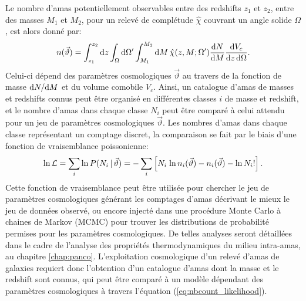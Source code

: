 Le nombre d'amas potentiellement observables entre des redshifts $z_1$ et $z_2$, entre des masses $M_1$ et $M_2$, pour un relevé de complétude $\hat{\chi}$ couvrant un angle solide $\Omega$, est alors donné par:
\begin{equation}
    \label{eq:nbcount_mass}
    n(\vec{\vartheta}) %
    = \int_{z_1}^{z_2} \d z
      \int_\Omega \d\Omega'
      \int_{M_1}^{M_2} \d M \,
        \hat{\chi}(z, M; \Omega') \frac{\d N}{\d M} \frac{\d V_c}{\d z \, \d\Omega}.
\end{equation}
Celui-ci dépend des paramètres cosmologiques $\vec{\vartheta}$ au travers de la fonction de masse $\mathrm{d} N / \mathrm{d} M$ et du volume comobile $V_c$.
Ainsi, un catalogue d'amas de masses et redshifts connus peut être organisé en différentes classes $i$ de masse et redshift, et le nombre d'amas dans chaque classe $N_i$ peut être comparé à celui attendu pour un jeu de paramètres cosmologiques $\vec{\vartheta}$.
Les nombres d'amas dans chaque classe représentant un comptage discret, la comparaison se fait par le biais d'une fonction de vraisemblance poissonienne:
\begin{equation}
    \label{eq:nbcount_likelihood}
    {\rm ln}\, \mathcal{L}
    = \sum_i {\rm ln}\, P(N_i \,|\, \vec{\vartheta})
    = -\sum_i \left[N_i \; {\rm ln}\, n_i(\vec{\vartheta}) - n_i(\vec{\vartheta}) - {\rm ln}\, N_i! \right].
\end{equation}
Cette fonction de vraisemblance peut être utilisée pour chercher le jeu de paramètres cosmologiques générant les comptages d'amas décrivant le mieux le jeu de données observé, ou encore injecté dans une procédure Monte Carlo à chaines de Markov (MCMC) pour trouver les distributions de probabilité permises pour les paramètres cosmologiques.
De telles analyses seront détaillées dans le cadre de l'analyse des propriétés thermodynamiques du milieu intra-amas, au chapitre \ref{chap:panco}.
L'exploitation cosmologique d'un relevé d'amas de galaxies requiert donc l'obtention d'un catalogue d'amas dont la masse et le redshift sont connus, qui peut être comparé à un modèle dépendant des paramètres cosmologiques à travers l'équation (\ref{eq:nbcount_likelihood}).

